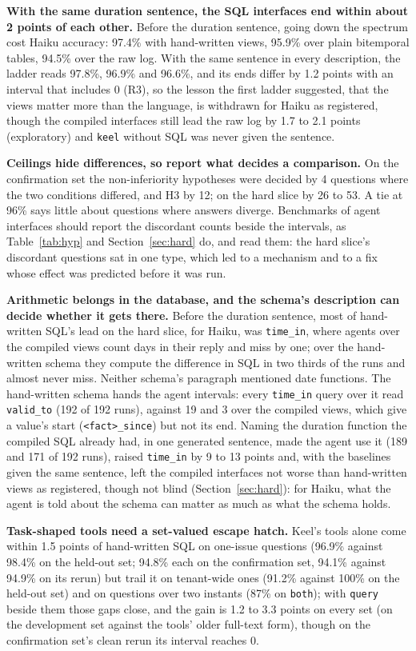 \documentclass[sigconf, nonacm]{acmart}
\newcommand{\code}[1]{\texttt{#1}}
\begin{document}
\textbf{With the same duration sentence, the SQL interfaces end within about 2 points of each other.} Before the duration sentence, going down the spectrum cost Haiku accuracy: 97.4\% with hand-written views, 95.9\% over plain bitemporal tables, 94.5\% over the raw log. With the same sentence in every description, the ladder reads 97.8\%, 96.9\% and 96.6\%, and its ends differ by 1.2 points with an interval that includes 0 (R3), so the lesson the first ladder suggested, that the views matter more than the language, is withdrawn for Haiku as registered, though the compiled interfaces still lead the raw log by 1.7 to 2.1 points (exploratory) and \code{keel} without SQL was never given the sentence.

\textbf{Ceilings hide differences, so report what decides a comparison.} On the confirmation set the non-inferiority hypotheses were decided by 4 questions where the two conditions differed, and H3 by 12; on the hard slice by 26 to 53. A tie at 96\% says little about questions where answers diverge. Benchmarks of agent interfaces should report the discordant counts beside the intervals, as Table~\ref{tab:hyp} and Section~\ref{sec:hard} do, and read them: the hard slice's discordant questions sat in one type, which led to a mechanism and to a fix whose effect was predicted before it was run.

\textbf{Arithmetic belongs in the database, and the schema's description can decide whether it gets there.} Before the duration sentence, most of hand-written SQL's lead on the hard slice, for Haiku, was \code{time\_in}, where agents over the compiled views count days in their reply and miss by one; over the hand-written schema they compute the difference in SQL in two thirds of the runs and almost never miss. Neither schema's paragraph mentioned date functions. The hand-written schema hands the agent intervals: every \code{time\_in} query over it read \code{valid\_to} (192 of 192 runs), against 19 and 3 over the compiled views, which give a value's start (\code{<fact>\_since}) but not its end. Naming the duration function the compiled SQL already had, in one generated sentence, made the agent use it (189 and 171 of 192 runs), raised \code{time\_in} by 9 to 13 points and, with the baselines given the same sentence, left the compiled interfaces not worse than hand-written views as registered, though not blind (Section~\ref{sec:hard}): for Haiku, what the agent is told about the schema can matter as much as what the schema holds.

\textbf{Task-shaped tools need a set-valued escape hatch.} Keel's tools alone come within 1.5 points of hand-written SQL on one-issue questions (96.9\% against 98.4\% on the held-out set; 94.8\% each on the confirmation set, 94.1\% against 94.9\% on its rerun) but trail it on tenant-wide ones (91.2\% against 100\% on the held-out set) and on questions over two instants (87\% on \code{both}); with \code{query} beside them those gaps close, and the gain is 1.2 to 3.3 points on every set (on the development set against the tools' older full-text form), though on the confirmation set's clean rerun its interval reaches 0.
\end{document}
